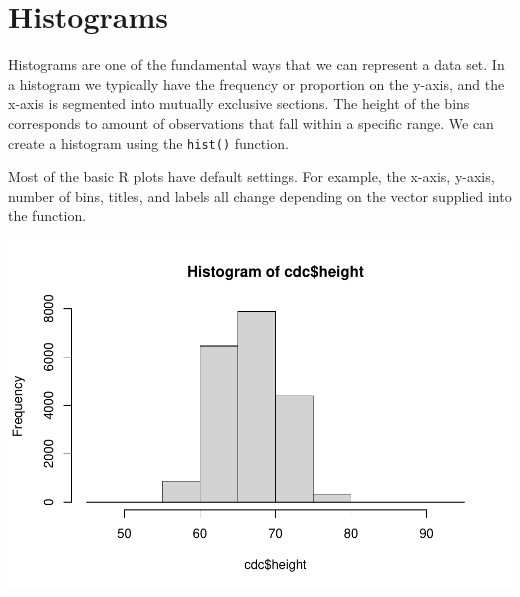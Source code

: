 \documentclass[
]{book}
\newenvironment{Shaded}{\begin{snugshade}}{\end{snugshade}}
\newcommand{\CommentTok}[1]{\textcolor[rgb]{0.56,0.35,0.01}{\textit{#1}}}
\newcommand{\KeywordTok}[1]{\textcolor[rgb]{0.13,0.29,0.53}{\textbf{#1}}}
\newcommand{\NormalTok}[1]{#1}
\newcommand{\OperatorTok}[1]{\textcolor[rgb]{0.81,0.36,0.00}{\textbf{#1}}}
\begin{document}
\hypertarget{histograms}{%
\section{Histograms}\label{histograms}}

Histograms are one of the fundamental ways that we can represent a data set. In a histogram we typically have the frequency or proportion on the y-axis, and the x-axis is segmented into mutually exclusive sections. The height of the bins corresponds to amount of observations that fall within a specific range. We can create a histogram using the \texttt{hist()} function.

Most of the basic R plots have default settings. For example, the x-axis, y-axis, number of bins, titles, and labels all change depending on the vector supplied into the function.

\begin{Shaded}
\end{Shaded}

\includegraphics{_main_files/figure-latex/unnamed-chunk-127-1.pdf}

\begin{Shaded}
\end{Shaded}
\end{document}
